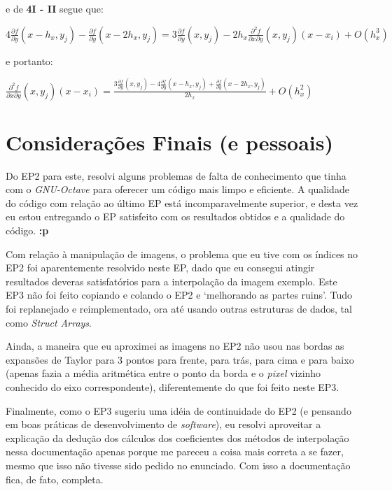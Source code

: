 \documentclass[11pt]{article}
\begin{document}
  e de \textbf{4I - II} segue que:

  $4\frac{\partial f}{\partial y}(x - h_x, y_j) - \frac{\partial f}{\partial y}(x - 2h_x, y_j) = 3\frac{\partial f}{\partial y}(x, y_j) - 2h_x\frac{\partial^2 f}{\partial x \partial y}\left(x, y_j \right)\left(x - x_i \right) + O(h_x^3)$

  e portanto:

  $\frac{\partial^2 f}{\partial x \partial y}\left(x, y_j \right)\left(x - x_i \right) = \frac{3\frac{\partial f}{\partial y}(x, y_j) - 4\frac{\partial f}{\partial y}(x - h_x, y_j) + \frac{\partial f}{\partial y}(x - 2h_x, y_j)}{2h_x}  + O(h_x^2)$

  \pagebreak

  \section{Considerações Finais (e pessoais)}

  \indent\indent Do EP2 para este, resolvi alguns problemas de falta de conhecimento que tinha com o \textit{GNU-Octave} para oferecer um código mais limpo e eficiente. A qualidade do código
  com relação ao último EP está incomparavelmente superior, e desta vez eu estou entregando o EP satisfeito com os resultados obtidos e a qualidade do código. \textbf{:p}

  Com relação à manipulação de imagens, o problema que eu tive com os índices no EP2 foi aparentemente resolvido neste EP, dado que eu consegui atingir resultados deveras satisfatórios para a interpolação da imagem exemplo.
  Este EP3 não foi feito copiando e colando o EP2 e `melhorando as partes ruins'. Tudo foi replanejado e reimplementado, ora até usando outras estruturas de dados, tal como \textit{Struct Arrays}.

  Ainda, a maneira que eu aproximei as imagens no EP2 não usou nas bordas as expansões de Taylor para 3 pontos para frente, para trás, para cima e para baixo (apenas fazia a média aritmética entre o ponto da borda
  e o \textit{pixel} vizinho conhecido do eixo correspondente), diferentemente do que foi feito neste EP3.

  Finalmente, como o EP3 sugeriu uma idéia de continuidade do EP2 (e pensando em boas práticas de desenvolvimento de \textit{software}), eu resolvi aproveitar a explicação da dedução dos cálculos dos
  coeficientes dos métodos de interpolação nessa documentação apenas porque me pareceu a coisa mais correta a se fazer, mesmo que isso não tivesse sido pedido no enunciado. Com isso a documentação fica, de fato, completa.
\end{document}

